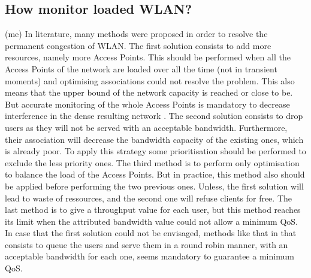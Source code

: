 \documentclass[journal,transmag]{IEEEtran}
\begin{document}
\subsection{How monitor loaded WLAN?} (me)
In literature, many methods were proposed in order to resolve the permanent congestion of WLAN. The first solution consists to add more resources, namely more Access Points. This should be performed when all the Access Points of the network are loaded over all the time (not in transient moments) and optimising associations could not resolve the problem. This also means that the upper bound of the network capacity is reached or close to be. But accurate monitoring of the whole Access Points is mandatory to decrease interference in the dense resulting network \cite{08Design_high_wifi_entreprise}. The second solution consists to drop users as they will not be served with an acceptable bandwidth. Furthermore, their association will decrease the bandwidth capacity of the existing ones, which is already poor. To apply this strategy some prioritisation should be performed to exclude the less priority ones. The third method is to perform only optimisation to balance the load of the Access Points. But in practice, this method also should be applied before performing the two previous ones. Unless, the first solution will lead to waste of ressources, and the second one will refuse clients for free. The last method is to give a  throughput value for each user, but this method reaches its limit when the attributed bandwidth value could not allow a minimum QoS. In case that the first solution could not be envisaged, methods like that in \cite{06practical_queue_based_AP_association} that consists to queue the users and serve them in a round robin manner, with an acceptable bandwidth for each one, seems mandatory to guarantee a minimum QoS.
\end{document}
